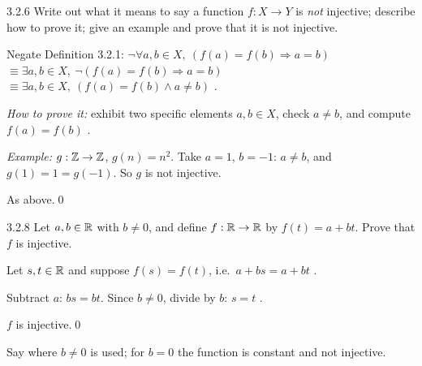 \begin{bookex}[recommended]{3.2.6}
Write out what it means to say a function $f:X\to Y$ is \emph{not} injective; describe how to prove it; give an example and prove that it is not injective.
\solution
\begin{steps}
\item Negate Definition 3.2.1: $\neg\forall a,b\in X,\ (f(a)=f(b)\Rightarrow a=b)$ $\equiv\exists a,b\in X,\ \neg(f(a)=f(b)\Rightarrow a=b)$  $\equiv\exists a,b\in X,\ (f(a)=f(b)\wedge a\ne b)$ .
\item \emph{How to prove it:} exhibit two specific elements $a,b\in X$, check $a\ne b$, and compute $f(a)=f(b)$ .
\item \emph{Example:} $g:\mathbb{Z}\to\mathbb{Z}$, $g(n)=n^2$. Take $a=1$, $b=-1$: $a\ne b$, and $g(1)=1=g(-1)$. So $g$ is not injective.
\end{steps}
\conclusion As above.\qed
\end{bookex}

\begin{bookex}[essential]{3.2.8}
Let $a,b\in\mathbb{R}$ with $b\ne0$, and define $f:\mathbb{R}\to\mathbb{R}$ by $f(t)=a+bt$. Prove that $f$ is injective.
\solution
\begin{steps}
\item Let $s,t\in\mathbb{R}$ and suppose $f(s)=f(t)$, i.e.\ $a+bs=a+bt$ .
\item Subtract $a$: $bs=bt$. Since $b\ne0$, divide by $b$: $s=t$ .
\end{steps}
\conclusion $f$ is injective.\qed
\begin{compare}
\item Say where $b\ne0$ is used; for $b=0$ the function is constant and not injective.
\end{compare}
\end{bookex}

